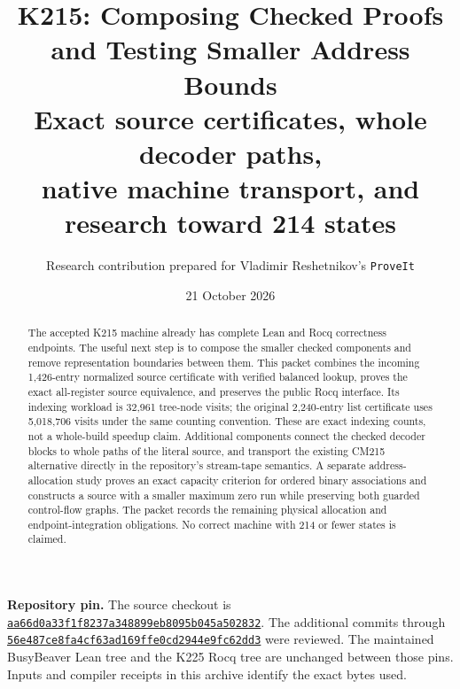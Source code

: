 \documentclass[11pt,letterpaper]{article}
\title{\textbf{K215: Composing Checked Proofs\\and Testing Smaller Address Bounds}\\[5pt]\large Exact source certificates, whole decoder paths,\\native machine transport, and research toward 214 states}
\author{Research contribution prepared for Vladimir Reshetnikov's \texttt{ProveIt}}
\date{21 October 2026}
\newcommand{\code}[1]{\texttt{#1}}
\begin{document}
\maketitle
\begin{abstract}
The accepted K215 machine already has complete Lean and Rocq correctness endpoints. The useful next step is to compose the smaller checked components and remove representation boundaries between them. This packet combines the incoming 1,426-entry normalized source certificate with verified balanced lookup, proves the exact all-register source equivalence, and preserves the public Rocq interface. Its indexing workload is 32,961 tree-node visits; the original 2,240-entry list certificate uses 5,018,706 visits under the same counting convention. These are exact indexing counts, not a whole-build speedup claim. Additional components connect the checked decoder blocks to whole paths of the literal source, and transport the existing CM215 alternative directly in the repository's stream-tape semantics. A separate address-allocation study proves an exact capacity criterion for ordered binary associations and constructs a source with a smaller maximum zero run while preserving both guarded control-flow graphs. The packet records the remaining physical allocation and endpoint-integration obligations. No correct machine with 214 or fewer states is claimed.
\end{abstract}
\noindent\textbf{Repository pin.} The source checkout is
\href{https://github.com/VladimirReshetnikov/ProveIt/commit/aa66d0a33f1f8237a348899eb8095b045a502832}{\code{aa66d0a33f1f8237a348899eb8095b045a502832}}.
The additional commits through
\href{https://github.com/VladimirReshetnikov/ProveIt/commit/56e487ce8fa4cf63ad169ffe0cd2944e9fc62dd3}{\code{56e487ce8fa4cf63ad169ffe0cd2944e9fc62dd3}}
were reviewed. The maintained BusyBeaver Lean tree and the K225 Rocq tree are unchanged between those pins. Inputs and compiler receipts in this archive identify the exact bytes used.
\newpage
\tableofcontents
\newpage
\end{document}
